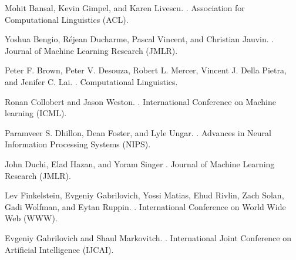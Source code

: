 \documentclass[11pt,a4paper]{article}
\begin{document}
\begin{thebibliography}{}

Mohit Bansal, Kevin Gimpel, and Karen Livescu.
.
\newblock Association for Computational Linguistics (ACL).

Yoshua Bengio, R\'{e}jean Ducharme, Pascal Vincent, and Christian Jauvin.
.
\newblock Journal of Machine Learning Research (JMLR).

Peter F. Brown, Peter V. Desouza, Robert L. Mercer, Vincent J. Della Pietra, and Jenifer C. Lai.
.
\newblock Computational Linguistics.

Ronan Collobert and Jason Weston.
.
\newblock International Conference on Machine learning (ICML).

Paramveer S. Dhillon, Dean Foster, and Lyle Ungar. 
.
\newblock Advances in Neural Information Processing Systems (NIPS).

John Duchi, Elad Hazan, and Yoram Singer
.
\newblock Journal of Machine Learning Research (JMLR).

Lev Finkelstein, Evgeniy Gabrilovich, Yossi Matias, Ehud Rivlin, Zach Solan, Gadi Wolfman, and Eytan Ruppin.
.
\newblock International Conference on World Wide Web (WWW).

Evgeniy Gabrilovich and Shaul Markovitch.
.
\newblock International Joint Conference on Artificial Intelligence (IJCAI).


\end{thebibliography}
\end{document}

